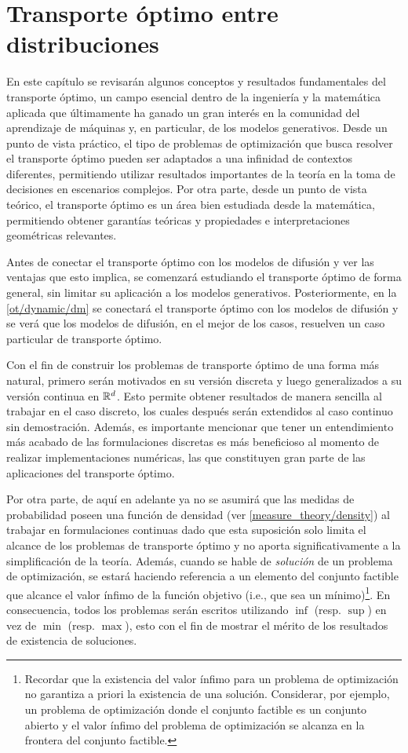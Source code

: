 \chapter{Transporte óptimo entre distribuciones}
\label{ot}

En este capítulo se revisarán algunos conceptos y resultados fundamentales del transporte óptimo, un campo esencial dentro de la ingeniería y la matemática aplicada que últimamente ha ganado un gran interés en la comunidad del aprendizaje de máquinas y, en particular, de los modelos generativos. Desde un punto de vista práctico, el tipo de problemas de optimización que busca resolver el transporte óptimo pueden ser adaptados a una infinidad de contextos diferentes, permitiendo utilizar resultados importantes de la teoría en la toma de decisiones en escenarios complejos. Por otra parte, desde un punto de vista teórico, el transporte óptimo es un área bien estudiada desde la matemática, permitiendo obtener garantías teóricas y propiedades e interpretaciones geométricas relevantes.

Antes de conectar el transporte óptimo con los modelos de difusión y ver las ventajas que esto implica, se comenzará estudiando el transporte óptimo de forma general, sin limitar su aplicación a los modelos generativos. Posteriormente, en la \autoref{ot/dynamic/dm} se conectará el transporte óptimo con los modelos de difusión y se verá que los modelos de difusión, en el mejor de los casos, resuelven un caso particular de transporte óptimo.

Con el fin de construir los problemas de transporte óptimo de una forma más natural, primero serán motivados en su versión discreta y luego generalizados a su versión continua en $\mathbb{R}^d$. Esto permite obtener resultados de manera sencilla al trabajar en el caso discreto, los cuales después serán extendidos al caso continuo sin demostración. Además, es importante mencionar que tener un entendimiento más acabado de las formulaciones discretas es más beneficioso al momento de realizar implementaciones numéricas, las que constituyen gran parte de las aplicaciones del transporte óptimo.

Por otra parte, de aquí en adelante ya no se asumirá que las medidas de probabilidad poseen una función de densidad (ver \autoref{measure_theory/density}) al trabajar en formulaciones continuas dado que esta suposición solo limita el alcance de los problemas de transporte óptimo y no aporta significativamente a la simplificación de la teoría. Además, cuando se hable de \textit{solución} de un problema de optimización, se estará haciendo referencia a un elemento del conjunto factible que alcance el valor ínfimo de la función objetivo (i.e., que sea un mínimo)\footnote{Recordar que la existencia del valor ínfimo para un problema de optimización no garantiza a priori la existencia de una solución. Considerar, por ejemplo, un problema de optimización donde el conjunto factible es un conjunto abierto y el valor ínfimo del problema de optimización se alcanza en la frontera del conjunto factible.}. En consecuencia, todos los problemas serán escritos utilizando $\inf$ (resp. $\sup$) en vez de $\min$ (resp. $\max$), esto con el fin de mostrar el mérito de los resultados de existencia de soluciones.

